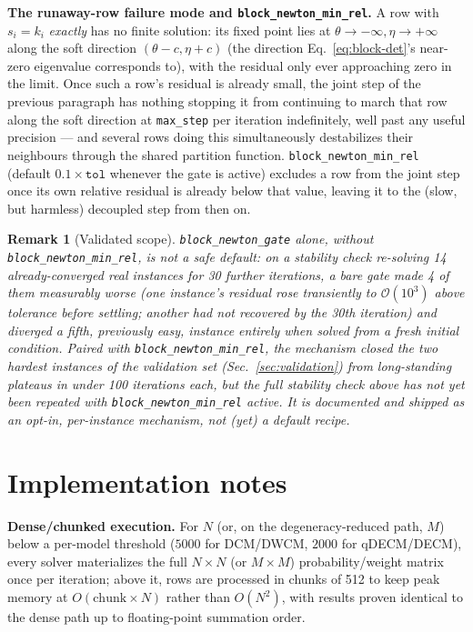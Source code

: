 \documentclass[10pt]{article}
\newtheorem{remark}{Remark}
\begin{document}
\textbf{The runaway-row failure mode and \texttt{block\_newton\_min\_rel}.}
A row with $s_i=k_i$ \emph{exactly} has no finite solution: its fixed
point lies at $\theta\to-\infty,\eta\to+\infty$ along the soft direction
$(\theta-c,\eta+c)$ (the direction Eq.~\ref{eq:block-det}'s near-zero
eigenvalue corresponds to), with the residual only ever approaching zero
in the limit. Once such a row's residual is already small, the joint step
of the previous paragraph has nothing stopping it from continuing to march
that row along the soft direction at \texttt{max\_step} per iteration
indefinitely, well past any useful precision --- and several rows doing
this simultaneously destabilizes their neighbours through the shared
partition function. \texttt{block\_newton\_min\_rel} (default $0.1\times\texttt{tol}$
whenever the gate is active) excludes a row from the joint step once its
own relative residual is already below that value, leaving it to the
(slow, but harmless) decoupled step from then on.

\begin{remark}[Validated scope]
\texttt{block\_newton\_gate} alone, without \texttt{block\_newton\_min\_rel},
is \emph{not} a safe default: on a stability check re-solving 14
already-converged real instances for 30 further iterations, a bare gate
made 4 of them measurably worse (one instance's residual rose transiently
to $\mathcal O(10^3)$ above tolerance before settling; another had not
recovered by the 30th iteration) and diverged a fifth, previously easy,
instance entirely when solved from a fresh initial condition. Paired with
\texttt{block\_newton\_min\_rel}, the mechanism closed the two hardest
instances of the validation set (Sec.~\ref{sec:validation}) from
long-standing plateaus in under 100 iterations each, but the full
stability check above has not yet been repeated with
\texttt{block\_newton\_min\_rel} active. It is documented and shipped as
an opt-in, per-instance mechanism, not (yet) a default recipe.
\end{remark}

\section{Implementation notes}
\label{sec:implementation}

\textbf{Dense/chunked execution.} For $N$ (or, on the degeneracy-reduced
path, $M$) below a per-model threshold ($5000$ for DCM/DWCM, $2000$ for
qDECM/DECM), every solver materializes the full $N\times N$ (or
$M\times M$) probability/weight matrix once per iteration; above it, rows
are processed in chunks of 512 to keep peak memory at $O(\mathrm{chunk}\times N)$
rather than $O(N^2)$, with results proven identical to the dense path up
to floating-point summation order.
\end{document}
